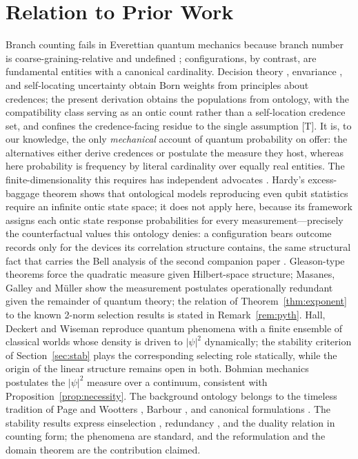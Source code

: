 \documentclass[11pt]{article}
\theoremstyle{definition}
\theoremstyle{remark}
\begin{document}
\section{Relation to Prior Work}\label{sec:related}
Branch counting fails in Everettian quantum mechanics \cite{Graham1973} because branch number is coarse-graining-relative and undefined \cite{Wallace2012}; configurations, by contrast, are fundamental entities with a canonical cardinality. Decision theory \cite{Deutsch1999,Wallace2007}, envariance \cite{Zurek2005}, and self-locating uncertainty \cite{SebensCarroll2018} obtain Born weights from principles about credences; the present derivation obtains the populations from ontology, with the compatibility class serving as an ontic count rather than a self-location credence set, and confines the credence-facing residue to the single assumption [T]. It is, to our knowledge, the only \emph{mechanical} account of quantum probability on offer: the alternatives either derive credences or postulate the measure they host, whereas here probability is frequency by literal cardinality over equally real entities. The finite-dimensionality this requires has independent advocates \cite{CarrollSingh2018,Bekenstein1981,Banks2001}. Hardy's excess-baggage theorem \cite{Hardy2004} shows that ontological models reproducing even qubit statistics require an infinite ontic state space; it does not apply here, because its framework assigns each ontic state response probabilities for every measurement---precisely the counterfactual values this ontology denies: a configuration bears outcome records only for the devices its correlation structure contains, the same structural fact that carries the Bell analysis of the second companion paper \cite{TillittCHSH}. Gleason-type theorems \cite{Gleason1957,Busch2003} force the quadratic measure given Hilbert-space structure; Masanes, Galley and M\"uller \cite{MGM2019} show the measurement postulates operationally redundant given the remainder of quantum theory; the relation of Theorem~\ref{thm:exponent} to the known 2-norm selection results is stated in Remark~\ref{rem:pyth}. Hall, Deckert and Wiseman \cite{HDW2014} reproduce quantum phenomena with a finite ensemble of classical worlds whose density is driven to $|\psi|^2$ dynamically; the stability criterion of Section~\ref{sec:stab} plays the corresponding selecting role statically, while the origin of the linear structure remains open in both. Bohmian mechanics \cite{Durr1992} postulates the $|\psi|^2$ measure over a continuum, consistent with Proposition~\ref{prop:necessity}. The background ontology belongs to the timeless tradition of Page and Wootters \cite{PageWootters1983}, Barbour \cite{Barbour1999}, and canonical formulations \cite{DeWitt1967}. The stability results express einselection \cite{Zurek2003}, redundancy \cite{Zurek2009}, and the duality relation \cite{WoottersZurek1979,Englert1996} in counting form; the phenomena are standard, and the reformulation and the domain theorem are the contribution claimed.
\end{document}
